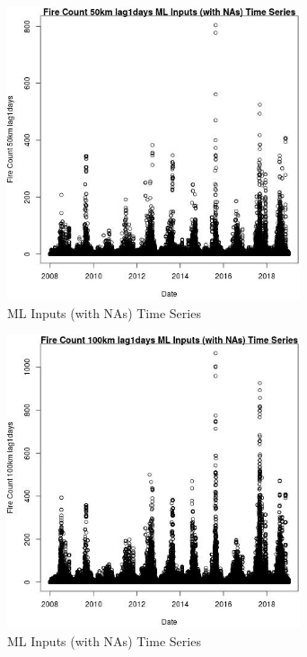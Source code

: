 \begin{figure} 
\centering  
\includegraphics[width=0.77\textwidth]{Code_Outputs/Report_ML_input_PM25_Step4_part_f_de_duplicated_aveswNAs_Fire_Count_50km_lag1daysvDate.jpg} 
\caption{\label{fig:Report_ML_input_PM25_Step4_part_f_de_duplicated_aveswNAsFire_Count_50km_lag1daysvDate}ML Inputs (with NAs) Time Series} 
\end{figure} 
 

\begin{figure} 
\centering  
\includegraphics[width=0.77\textwidth]{Code_Outputs/Report_ML_input_PM25_Step4_part_f_de_duplicated_aveswNAs_Fire_Count_100km_lag1daysvDate.jpg} 
\caption{\label{fig:Report_ML_input_PM25_Step4_part_f_de_duplicated_aveswNAsFire_Count_100km_lag1daysvDate}ML Inputs (with NAs) Time Series} 
\end{figure} 
 

